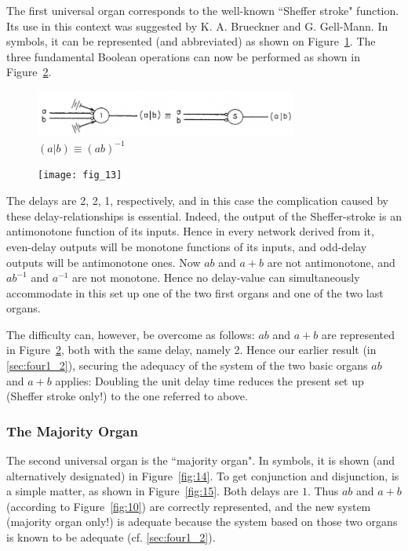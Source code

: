\documentclass[twocolumn,preprintnumbers,amsmath,amssymb,floatfix]{revtex4}
\begin{document}
The first universal organ corresponds to the well-known ``Sheffer
stroke" function. Its use in this context was suggested by K. A.
Brueckner and G. Gell-Mann. In symbols, it can be represented (and
abbreviated) as shown on Figure~\ref{fig:12}. The three
fundamental Boolean operations can now be performed as shown in
Figure~\ref{fig:13}.

\begin{figure}[b]
\includegraphics[width=3.4in]{fig_12}
\caption{\label{fig:12}$(a|b)\equiv (ab)^{-1}$}
\end{figure}

\begin{figure}[t]
\texttt{[image: fig\_13]}
\caption{\label{fig:13}}
\end{figure}

The delays are 2, 2, 1, respectively, and in this case the
complication caused by these delay-relationships is essential.
Indeed, the output of the Sheffer-stroke is an antimonotone
function of its inputs. Hence in every network derived from it,
even-delay outputs will be monotone functions of its inputs, and
odd-delay outputs will be antimonotone ones. Now $ab$ and $a+b$
are not antimonotone, and $ab^{-1}$ and $a^{-1}$ are not monotone.
Hence no delay-value can simultaneously accommodate in this set up
one of the two first organs and one of the two last organs.

The difficulty can, however, be overcome as follows: $ab$ and
$a+b$ are represented in Figure~\ref{fig:13}, both with the same
delay, namely 2. Hence our earlier result (in \ref{sec:four1_2}),
securing the adequacy of the system of the two basic organs $ab$
and $a+b$ applies: Doubling the unit delay time reduces the
present set up (Sheffer stroke only!) to the one referred to
above.

\subsubsection{\label{sec:four2_2}The Majority Organ} The second
universal organ is the ``majority organ". In symbols, it is shown
(and alternatively designated) in Figure~\ref{fig:14}. To get
conjunction and disjunction, is a simple matter, as shown in
Figure~\ref{fig:15}. Both delays are $1$. Thus $ab$ and $a+b$
(according to Figure~\ref{fig:10}) are correctly represented, and
the new system (majority organ only!) is adequate because the
system based on those two organs is known to be adequate (cf.
\ref{sec:four1_2}).
\end{document}
